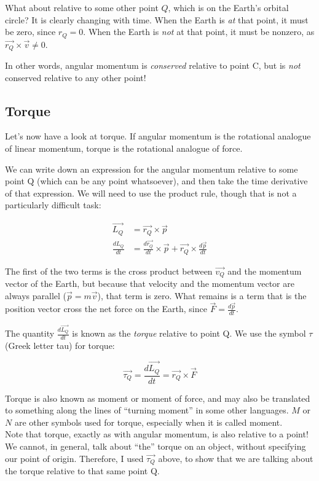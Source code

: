 \documentclass[8.01x]{subfiles}
\begin{document}
What about relative to some other point $Q$, which is on the Earth's orbital circle? It is clearly changing with time. When the Earth is \emph{at} that point, it must be zero, since $r_Q = 0$. When the Earth is \emph{not} at that point, it must be nonzero, as $\vec{r_Q} \times \vec{v} \neq 0$.

In other words, angular momentum is \emph{conserved} relative to point C, but is \emph{not} conserved relative to any other point!

\subsection{Torque}

Let's now have a look at torque. If angular momentum is the rotational analogue of linear momentum, torque is the rotational analogue of force.

We can write down an expression for the angular momentum relative to some point Q (which can be any point whatsoever), and then take the time derivative of that expression. We will need to use the product rule, though that is not a particularly difficult task:

\begin{align}
\vec{L_Q} &= \vec{r_Q} \times \vec{p}\\
\frac{dL_Q}{dt} &= \frac{d\vec{r_Q}}{dt} \times \vec{p} + \vec{r_Q} \times \frac{d\vec{p}}{dt}
\end{align}

The first of the two terms is the cross product between $\vec{v_Q}$ and the momentum vector of the Earth, but because that velocity and the momentum vector are always parallel ($\vec{p} = m \vec{v}$), that term is zero. What remains is a term that is the position vector cross the net force on the Earth, since $\displaystyle \vec{F} = \frac{d\vec{p}}{dt}$.

The quantity $\displaystyle \frac{d\vec{L_Q}}{dt}$ is known as the \emph{torque} relative to point Q. We use the symbol $\tau$ (Greek letter tau) for torque:

\begin{equation}
\vec{\tau_Q} = \frac{d\vec{L_Q}}{dt} = \vec{r_Q} \times \vec{F}
\end{equation}

Torque is also known as moment or moment of force, and may also be translated to something along the lines of ``turning moment'' in some other languages. $M$ or $N$ are other symbols used for torque, especially when it is called moment.\\
Note that torque, exactly as with angular momentum, is also relative to a point! We cannot, in general, talk about ``the'' torque on an object, without specifying our point of origin. Therefore, I used $\vec{\tau_Q}$ above, to show that we are talking about the torque relative to that same point Q.
\end{document}
